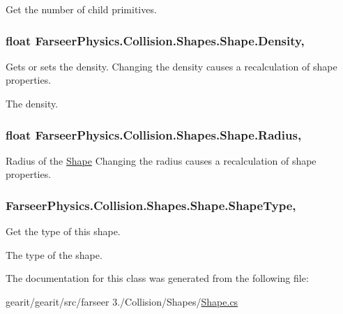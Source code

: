 Get the number of child primitives. 

\hypertarget{class_farseer_physics_1_1_collision_1_1_shapes_1_1_shape_a69dd415bc7de2c542b841862fb7a6583}{
\subsubsection[{Density}]{\setlength{\rightskip}{0pt plus 5cm}float Farseer\+Physics.\+Collision.\+Shapes.\+Shape.\+Density\hspace{0.3cm}{\ttfamily [get]}, {\ttfamily [set]}}}\label{class_farseer_physics_1_1_collision_1_1_shapes_1_1_shape_a69dd415bc7de2c542b841862fb7a6583}


Gets or sets the density. Changing the density causes a recalculation of shape properties. 

The density.\hypertarget{class_farseer_physics_1_1_collision_1_1_shapes_1_1_shape_a5c215611dc4f97f65b3da40c8f96f132}{
\subsubsection[{Radius}]{\setlength{\rightskip}{0pt plus 5cm}float Farseer\+Physics.\+Collision.\+Shapes.\+Shape.\+Radius\hspace{0.3cm}{\ttfamily [get]}, {\ttfamily [set]}}}\label{class_farseer_physics_1_1_collision_1_1_shapes_1_1_shape_a5c215611dc4f97f65b3da40c8f96f132}


Radius of the \hyperlink{class_farseer_physics_1_1_collision_1_1_shapes_1_1_shape}{Shape} Changing the radius causes a recalculation of shape properties. 

\hypertarget{class_farseer_physics_1_1_collision_1_1_shapes_1_1_shape_a4731b9af786f3e7b6dfaafdc12771e18}{
\subsubsection[{Shape\+Type}]{ Farseer\+Physics.\+Collision.\+Shapes.\+Shape.\+Shape\+Type\hspace{0.3cm}{\ttfamily [get]}, {\ttfamily [set]}}}\label{class_farseer_physics_1_1_collision_1_1_shapes_1_1_shape_a4731b9af786f3e7b6dfaafdc12771e18}


Get the type of this shape. 

The type of the shape.

The documentation for this class was generated from the following file\+:\begin{DoxyCompactItemize}
\item 
gearit/gearit/src/farseer 3./\+Collision/\+Shapes/\hyperlink{_shape_8cs}{Shape.\+cs}\end{DoxyCompactItemize}
